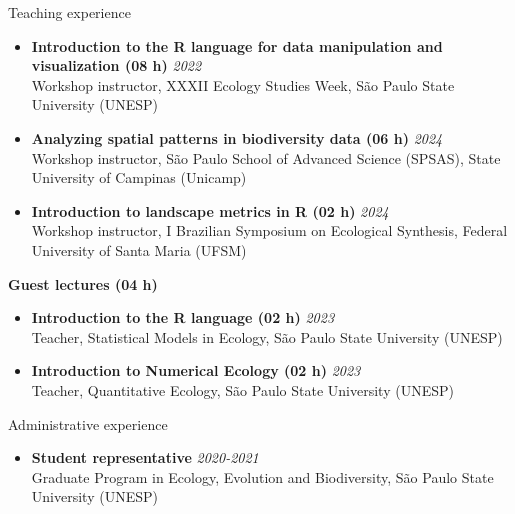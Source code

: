 \documentclass{resume}
\begin{document}
\begin{rSection}{Teaching experience}
\begin{itemize}
\item \textbf{Introduction to the R language for data manipulation and visualization (08 h)} \hfill{\em 2022}\\
Workshop instructor, XXXII Ecology Studies Week, São Paulo State University (UNESP)

\item \textbf{Analyzing spatial patterns in biodiversity data (06 h)} \hfill{\em 2024}\\
Workshop instructor, São Paulo School of Advanced Science (SPSAS), State University of Campinas (Unicamp)

\item \textbf{Introduction to landscape metrics in R (02 h)} \hfill{\em 2024}\\
Workshop instructor, I Brazilian Symposium on Ecological Synthesis, Federal University of Santa Maria (UFSM)
\end{itemize}

\textbf{Guest lectures (04 h)}
\begin{itemize}
\item \textbf{Introduction to the R language (02 h)} \hfill{\em 2023}\\
Teacher, Statistical Models in Ecology, São Paulo State University (UNESP) 

\item \textbf{Introduction to Numerical Ecology (02 h)} \hfill{\em 2023}\\
Teacher, Quantitative Ecology, São Paulo State University (UNESP)

\end{itemize}
\end{rSection}


\begin{rSection}{Administrative experience}
\begin{itemize}
\item \textbf{Student representative} \hfill{\em 2020-2021}\\
Graduate Program in Ecology, Evolution and Biodiversity, São Paulo State University (UNESP)
\end{itemize}
\end{rSection}

\end{document}

